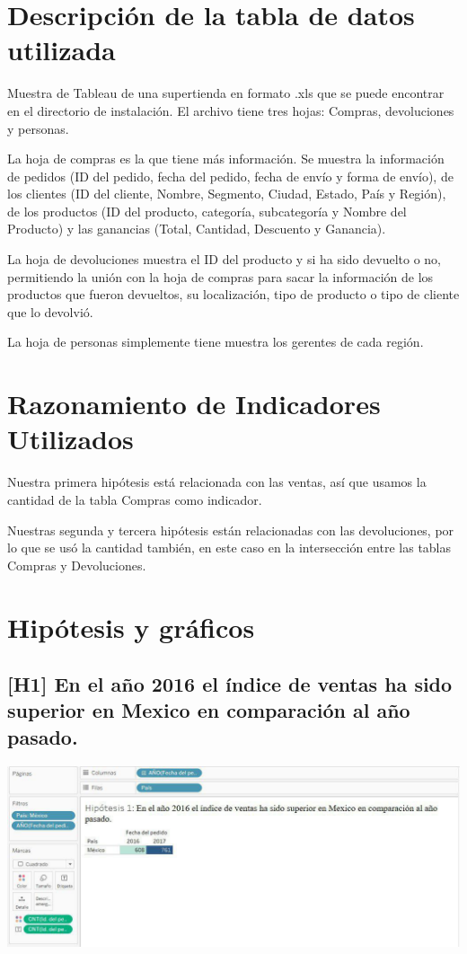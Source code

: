 \documentclass{article}
\begin{document}
\section{Descripción de la tabla de datos utilizada}
Muestra de Tableau de una supertienda en formato .xls que se puede encontrar en el directorio de instalación. El archivo tiene tres hojas: Compras, devoluciones y personas. 

La hoja de compras es la que tiene más información. Se muestra la información de pedidos (ID del pedido, fecha del pedido, fecha de envío y forma de envío), de los clientes (ID del cliente, Nombre, Segmento, Ciudad, Estado, País y Región), de los productos (ID del producto, categoría, subcategoría y Nombre del Producto) y las ganancias (Total, Cantidad, Descuento y Ganancia). 

La hoja de devoluciones muestra el ID del producto y si ha sido devuelto o no, permitiendo la unión con la hoja de compras para sacar la información de los productos que fueron devueltos, su localización, tipo de producto o tipo de cliente que lo devolvió. 

La hoja de personas simplemente tiene muestra los gerentes de cada región. 

\section{Razonamiento de Indicadores Utilizados}

Nuestra primera hipótesis está relacionada con las ventas, así que usamos la cantidad  de la tabla Compras como indicador. 

Nuestras segunda y tercera hipótesis están relacionadas con las devoluciones, por lo que se usó la cantidad también, en este caso en la intersección entre las tablas Compras y Devoluciones. 

\section{Hipótesis y gráficos}

\subsection{[H1] En el año 2016 el índice de ventas ha sido superior en Mexico en comparación al año pasado.}

\begin{center}
\includegraphics[scale=0.5]{imagenes/Hipotesis1.jpg} 
\end{center}
\end{document}
